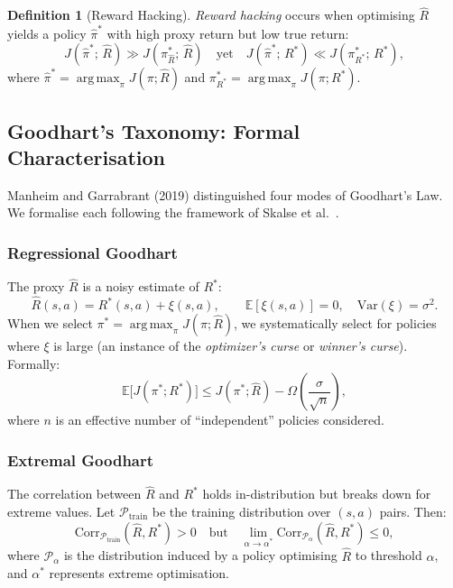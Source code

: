 \documentclass[11pt,a4paper]{article}
\theoremstyle{definition}
\newtheorem{definition}[theorem]{Definition}
\newcommand{\E}{\mathbb{E}}
\DeclareMathOperator*{\argmax}{arg\,max}
\begin{document}
\begin{definition}[Reward Hacking]
\emph{Reward hacking} occurs when optimising $\hat{R}$ yields a policy
$\hat{\pi}^*$ with high proxy return but low true return:
\begin{equation}\label{eq:reward_hack}
  J(\hat{\pi}^*;\, \hat{R}) \gg J(\pi^*_{\hat{R}};\, \hat{R})
  \quad\text{yet}\quad
  J(\hat{\pi}^*;\, R^*) \ll J(\pi^*_{R^*};\, R^*),
\end{equation}
where $\hat{\pi}^* = \argmax_\pi J(\pi; \hat{R})$ and
$\pi^*_{R^*} = \argmax_\pi J(\pi; R^*)$.
\end{definition}

\subsection{Goodhart's Taxonomy: Formal Characterisation}

Manheim and Garrabrant (2019) \cite{manheim2019categorizing}
distinguished four modes of Goodhart's Law. We formalise each
following the framework of Skalse et al.\ \cite{skalse2022defining}.

\subsubsection{Regressional Goodhart}

The proxy $\hat{R}$ is a noisy estimate of $R^*$:
\begin{equation}
  \hat{R}(s,a) = R^*(s,a) + \xi(s,a), \qquad
  \E[\xi(s,a)] = 0, \quad \mathrm{Var}(\xi) = \sigma^2.
\end{equation}
When we select $\pi^* = \argmax_\pi J(\pi; \hat{R})$, we
systematically select for policies where $\xi$ is large (an instance of
the \emph{optimizer's curse} or \emph{winner's curse}). Formally:
\begin{equation}
  \E\!\big[J(\pi^*; R^*)\big]
  \leq J(\pi^*; \hat{R}) - \Omega\!\left(\frac{\sigma}{\sqrt{n}}\right),
\end{equation}
where $n$ is an effective number of ``independent'' policies considered.

\subsubsection{Extremal Goodhart}

The correlation between $\hat{R}$ and $R^*$ holds in-distribution but
breaks down for extreme values. Let $\mathcal{P}_{\text{train}}$ be the
training distribution over $(s,a)$ pairs. Then:
\begin{equation}
  \mathrm{Corr}_{\mathcal{P}_{\text{train}}}(\hat{R}, R^*) > 0
  \quad\text{but}\quad
  \lim_{\alpha \to \alpha^*}
    \mathrm{Corr}_{\mathcal{P}_\alpha}(\hat{R}, R^*) \leq 0,
\end{equation}
where $\mathcal{P}_\alpha$ is the distribution induced by a policy
optimising $\hat{R}$ to threshold $\alpha$, and $\alpha^*$ represents
extreme optimisation.
\end{document}
